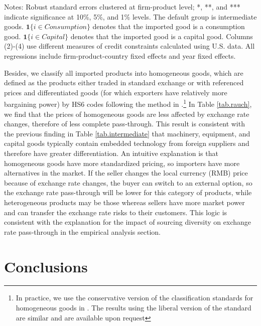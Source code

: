 \begin{table}[H]
\begin{threeparttable}
		\begin{tablenotes}
			\footnotesize
			\item Notes: Robust standard errors clustered at firm-product level; *, **, and *** indicate significance at 10\%, 5\%, and 1\% levels. The default group is intermediate goods. $\mathbf{1}\{i \in Consumption\}$ denotes that the imported good is a consumption good. $\mathbf{1}\{i \in Capital\}$ denotes that the imported good is a capital good. Columns (2)-(4) use different measures of credit constraints calculated using U.S. data. All regressions include firm-product-country fixed effects and year fixed effects.
		\end{tablenotes}
	\end{threeparttable}
	\label{tab.intermediate}
\end{table}

Besides, we classify all imported products into homogeneous goods, which are defined as the products either traded in standard exchange or with referenced prices and differentiated goods (for which exporters have relatively more bargaining power) by HS6 codes following the method in \cite{rauch1999networks}.\footnote{In practice, we use the conservative version of the classification standards for homogeneous goods in \cite{rauch1999networks}. The results using the liberal version of the standard are similar and are available upon request} In Table \ref{tab.rauch}, we find that the prices of homogeneous goods are less affected by exchange rate changes, therefore of less complete pass-through. This result is consistent with the previous finding in Table \ref{tab.intermediate} that machinery, equipment, and capital goods typically contain embedded technology from foreign suppliers and therefore have greater differentiation. An intuitive explanation is that homogeneous goods have more standardized pricing, so importers have more alternatives in the market. If the seller changes the local currency (RMB) price because of exchange rate changes, the buyer can switch to an external option, so the exchange rate pass-through will be lower for this category of products, while heterogeneous products may be those whereas sellers have more market power and can transfer the exchange rate risks to their customers. This logic is consistent with the explanation for the impact of sourcing diversity on exchange rate pass-through in the empirical analysis section.

\section{Conclusions}\label{Conclusion}

